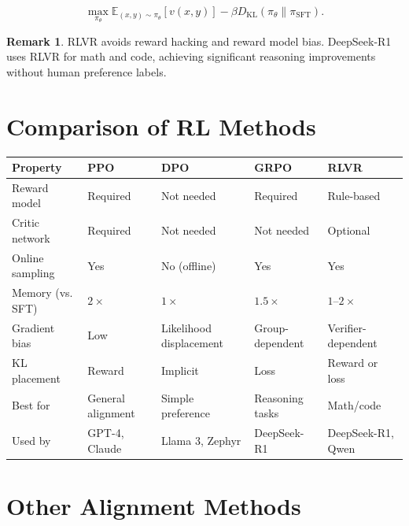 \documentclass[11pt,a4paper]{book}
\theoremstyle{definition}
\newtheorem{remark}{Remark}[chapter]
\begin{document}
\begin{equation}
	\max_{\pi_\theta} \mathbb{E}_{(x,y) \sim \pi_\theta}[v(x,y)] - \beta D_{\mathrm{KL}}(\pi_\theta \parallel \pi_{\text{SFT}}).
\end{equation}

\begin{remark}
	RLVR avoids reward hacking and reward model bias. DeepSeek-R1 uses RLVR for math and code, achieving significant reasoning improvements without human preference labels.
\end{remark}

\section{Comparison of RL Methods}

\begin{longtable}{p{2.5cm}p{3cm}p{3cm}p{3cm}p{3cm}}
	\toprule
	\textbf{Property} & \textbf{PPO}      & \textbf{DPO}            & \textbf{GRPO}   & \textbf{RLVR}       \\
	\midrule
	Reward model      & Required          & Not needed              & Required        & Rule-based          \\
	Critic network    & Required          & Not needed              & Not needed      & Optional            \\
	Online sampling   & Yes               & No (offline)            & Yes             & Yes                 \\
	Memory (vs. SFT)  & $2\times$         & $1\times$               & $1.5\times$     & $1\text{--}2\times$ \\
	Gradient bias     & Low               & Likelihood displacement & Group-dependent & Verifier-dependent  \\
	KL placement      & Reward            & Implicit                & Loss            & Reward or loss      \\
	Best for          & General alignment & Simple preference       & Reasoning tasks & Math/code           \\
	Used by           & GPT-4, Claude     & Llama 3, Zephyr         & DeepSeek-R1     & DeepSeek-R1, Qwen   \\
	\bottomrule
\end{longtable}

\section{Other Alignment Methods}
\end{document}

